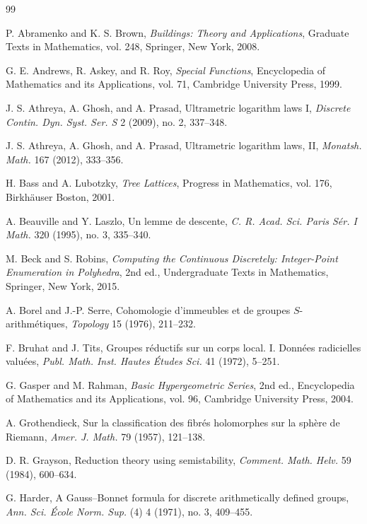 \documentclass[11pt]{amsart}
\theoremstyle{plain}
\theoremstyle{definition}
\numberwithin{equation}{section}
\begin{document}
\begin{thebibliography}{99}

P. Abramenko and K. S. Brown,
\emph{Buildings: Theory and Applications}, Graduate Texts in Mathematics, vol. 248,
Springer, New York, 2008.

G. E. Andrews, R. Askey, and R. Roy,
\emph{Special Functions}, Encyclopedia of Mathematics and its Applications, vol. 71,
Cambridge University Press, 1999.

J. S. Athreya, A. Ghosh, and A. Prasad,
Ultrametric logarithm laws I,
\emph{Discrete Contin. Dyn. Syst. Ser. S} 2 (2009), no. 2, 337--348.

J. S. Athreya, A. Ghosh, and A. Prasad,
Ultrametric logarithm laws, II,
\emph{Monatsh. Math.} 167 (2012), 333--356.

H. Bass and A. Lubotzky,
\emph{Tree Lattices}, Progress in Mathematics, vol. 176, Birkh\"auser Boston, 2001.

A. Beauville and Y. Laszlo,
Un lemme de descente,
\emph{C. R. Acad. Sci. Paris S\'er. I Math.} 320 (1995), no. 3, 335--340.

M. Beck and S. Robins,
\emph{Computing the Continuous Discretely: Integer-Point Enumeration in Polyhedra},
2nd ed., Undergraduate Texts in Mathematics, Springer, New York, 2015.


A. Borel and J.-P. Serre,
Cohomologie d'immeubles et de groupes $S$-arithm\'etiques,
\emph{Topology} 15 (1976), 211--232.

F. Bruhat and J. Tits,
Groupes r\'eductifs sur un corps local. I. Donn\'ees radicielles valu\'ees,
\emph{Publ. Math. Inst. Hautes \'Etudes Sci.} 41 (1972), 5--251.

G. Gasper and M. Rahman,
\emph{Basic Hypergeometric Series}, 2nd ed., Encyclopedia of Mathematics and its
Applications, vol. 96, Cambridge University Press, 2004.

A. Grothendieck,
Sur la classification des fibr\'es holomorphes sur la sph\`ere de Riemann,
\emph{Amer. J. Math.} 79 (1957), 121--138.

D. R. Grayson,
Reduction theory using semistability,
\emph{Comment. Math. Helv.} 59 (1984), 600--634.

G. Harder,
A Gauss--Bonnet formula for discrete arithmetically defined groups,
\emph{Ann. Sci. \'Ecole Norm. Sup.} (4) 4 (1971), no. 3, 409--455.


\end{thebibliography}
\end{document}
